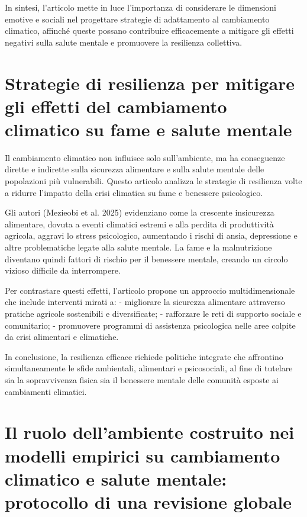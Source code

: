 \documentclass[
]{article}
\begin{document}
In sintesi, l'articolo mette in luce l'importanza di considerare le
dimensioni emotive e sociali nel progettare strategie di adattamento al
cambiamento climatico, affinché queste possano contribuire efficacemente
a mitigare gli effetti negativi sulla salute mentale e promuovere la
resilienza collettiva.

\section{Strategie di resilienza per mitigare gli effetti del
cambiamento climatico su fame e salute
mentale}\label{strategie-di-resilienza-per-mitigare-gli-effetti-del-cambiamento-climatico-su-fame-e-salute-mentale}

Il cambiamento climatico non influisce solo sull'ambiente, ma ha
conseguenze dirette e indirette sulla sicurezza alimentare e sulla
salute mentale delle popolazioni più vulnerabili. Questo articolo
analizza le strategie di resilienza volte a ridurre l'impatto della
crisi climatica su fame e benessere psicologico.

Gli autori (Mezieobi et al. 2025) evidenziano come la crescente
insicurezza alimentare, dovuta a eventi climatici estremi e alla perdita
di produttività agricola, aggravi lo stress psicologico, aumentando i
rischi di ansia, depressione e altre problematiche legate alla salute
mentale. La fame e la malnutrizione diventano quindi fattori di rischio
per il benessere mentale, creando un circolo vizioso difficile da
interrompere.

Per contrastare questi effetti, l'articolo propone un approccio
multidimensionale che include interventi mirati a: - migliorare la
sicurezza alimentare attraverso pratiche agricole sostenibili e
diversificate; - rafforzare le reti di supporto sociale e comunitario; -
promuovere programmi di assistenza psicologica nelle aree colpite da
crisi alimentari e climatiche.

In conclusione, la resilienza efficace richiede politiche integrate che
affrontino simultaneamente le sfide ambientali, alimentari e
psicosociali, al fine di tutelare sia la sopravvivenza fisica sia il
benessere mentale delle comunità esposte ai cambiamenti climatici.

\section{Il ruolo dell'ambiente costruito nei modelli empirici su
cambiamento climatico e salute mentale: protocollo di una revisione
globale}\label{il-ruolo-dellambiente-costruito-nei-modelli-empirici-su-cambiamento-climatico-e-salute-mentale-protocollo-di-una-revisione-globale}
\end{document}
